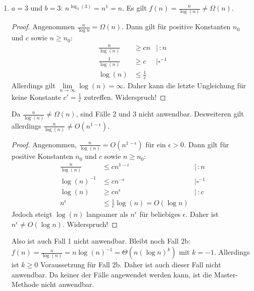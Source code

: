 \documentclass[11pt,a4paper]{article}
\begin{document}
\begin{loesung}
\begin{enumerate}
\begin{enumerate}[label=\roman*)]
        \item $a = 3$ und $b = 3$: $n^{\log_3(3)} = n^1 = n$.
        Es gilt $f(n) = \frac{n}{\log(n)} \neq \Omega(n)$.
        \begin{proof}
            Angenommen $\frac{n}{\log n} = \Omega(n)$.
            Dann gilt für positive Konstanten $n_0$ und $c$ sowie $n \geq n_0$: 
            \begin{align*}
                \frac{n}{\log(n)} &\geq cn &\mid \, : n \\
                \frac{1}{\log(n)} &\geq c &\mid \square^{-1} \\
                \log(n) &\leq \frac{1}{c}
            \end{align*}
            Allerdings gilt $\lim\limits_{n \rightarrow \infty} \log(n) = \infty$.
            Daher kann die letzte Ungleichung für keine Konstante $c' = \frac{1}{c}$ zutreffen.
            Widerspruch!
        \end{proof}
        Da $\frac{n}{\log(n)} \neq \Omega(n)$, sind Fälle 2 und 3 nicht anwendbar.
        Desweiteren gilt allerdings $\frac{n}{\log(n)} \neq O(n^{1 - \epsilon})$.
        \begin{proof}
            Angenommen, $\frac{n}{\log(n)} = O(n^{1 - \epsilon})$ für ein $\epsilon > 0$.
            Dann gilt für positive Konstanten $n_0$ und $c$ sowie $n \geq n_0$: 
            \begin{align*}
                \frac{n}{\log(n)} &\leq cn^{1 - \epsilon} &\mid \, : n \\
                \log(n)^{-1} &\leq cn^{-\epsilon} &\mid \square^{-1} \\
                \log(n) &\geq c n^{\epsilon} &\mid \, : c \\
                n^\epsilon &\leq \frac{1}{c} \log(n) = O(\log n)
            \end{align*}
            Jedoch steigt $\log(n)$ langsamer als $n^\epsilon$ für beliebiges $\epsilon$.
            Daher ist $n^\epsilon \neq O(\log n)$. Widerspruch!
        \end{proof}
        Also ist auch Fall 1 nicht anwendbar.
        Bleibt noch Fall 2b: $f(n) = \frac{n}{\log(n)} = n \log(n)^{-1} = \Theta(n (\log n)^{k})$ mit $k = -1$.
        Allerdings ist $k \geq 0$ Voraussetzung für Fall 2b.
        Daher ist auch dieser Fall nicht anwendbar.
        Da keiner der Fälle angewendet werden kann, ist die Master-Methode nicht anwendbar.
    \end{enumerate}


\end{enumerate}
\end{loesung}
\end{document}
